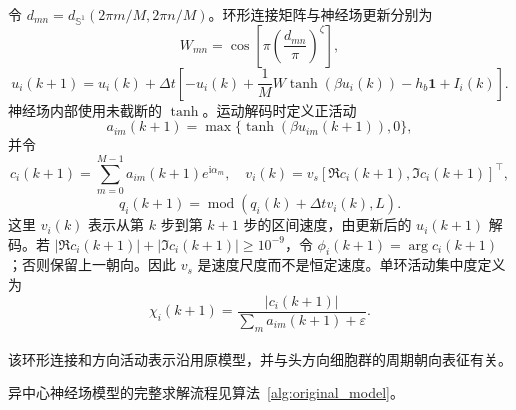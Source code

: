 \documentclass[UTF8,fontset=windows,11pt]{ctexart}
\newcommand{\upcite}[1]{\textsuperscript{\cite{#1}}}
\begin{document}
令 $d_{mn}=d_{\mathbb S^1}(2\pi m/M,2\pi n/M)$。环形连接矩阵与神经场更新分别为
\begin{equation}
 W_{mn}=\cos\left[\pi\left(\frac{d_{mn}}{\pi}\right)^\zeta\right],
\end{equation}
\begin{equation}
 u_i(k+1)=u_i(k)+\Delta t\left[-u_i(k)+\frac{1}{M}W\tanh(\beta u_i(k))-h_b\bm 1+I_i(k)\right].
\end{equation}
神经场内部使用未截断的 $\tanh$。运动解码时定义正活动
\begin{equation}
 a_{im}(k+1)=\max\{\tanh(\beta u_{im}(k+1)),0\},
\end{equation}
并令
\begin{equation}
 c_i(k+1)=\sum_{m=0}^{M-1}a_{im}(k+1)e^{\mathrm i\alpha_m},
\quad
 v_i(k)=v_s[\Re c_i(k+1),\Im c_i(k+1)]^\top,
\end{equation}
\begin{equation}
 q_i(k+1)=\operatorname{mod}(q_i(k)+\Delta t v_i(k),L).
\end{equation}
这里 $v_i(k)$ 表示从第 $k$ 步到第 $k+1$ 步的区间速度，由更新后的 $u_i(k+1)$ 解码。若 $|\Re c_i(k+1)|+|\Im c_i(k+1)|\ge10^{-9}$，令 $\phi_i(k+1)=\arg c_i(k+1)$；否则保留上一朝向。因此 $v_s$ 是速度尺度而不是恒定速度。单环活动集中度定义为
\begin{equation}
 \chi_i(k+1)=\frac{|c_i(k+1)|}{\sum_m a_{im}(k+1)+\varepsilon}.
\end{equation}

该环形连接和方向活动表示沿用原模型，并与头方向细胞群的周期朝向表征有关\upcite{Zhang1996}。

异中心神经场模型的完整求解流程见算法~\ref{alg:original_model}。
\end{document}

